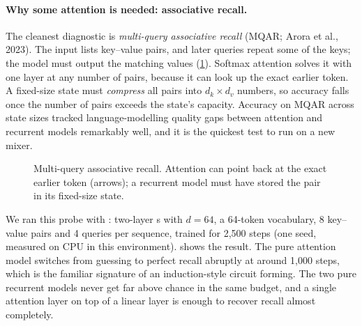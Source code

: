 \paragraph{Why some attention is needed: associative recall.} The cleanest diagnostic is
\emph{multi-query associative recall} (MQAR; Arora et al., 2023). The input lists key--value pairs, and later
queries repeat some of the keys; the model must output the matching values (\cref{fig:attnalt:mqar}).
Softmax attention solves it with one layer at any number of pairs, because it can look up the exact earlier
token. A fixed-size state must \emph{compress} all pairs into $d_k\times d_v$ numbers, so accuracy falls
once the number of pairs exceeds the state's capacity. Accuracy on MQAR across state sizes tracked
language-modelling quality gaps between attention and recurrent models remarkably well, and it is the
quickest test to run on a new mixer.

\begin{figure}[t]
\centering
{}
\caption{Multi-query associative recall. Attention can point back at the exact earlier token (arrows); a
recurrent model must have stored the pair in its fixed-size state.}
\label{fig:attnalt:mqar}
\end{figure}

We ran this probe with : two-layer s with $d=64$, a
64-token vocabulary, 8 key--value pairs and 4 queries per sequence, trained for 2{,}500 steps (one seed,
measured on CPU in this environment).  shows the result. The pure attention model
switches from guessing to perfect recall abruptly at around 1{,}000 steps, which is the familiar signature of an
induction-style circuit forming. The two pure recurrent models never get far above chance in the same budget, and a
single attention layer on top of a linear layer is enough to recover recall almost completely.

